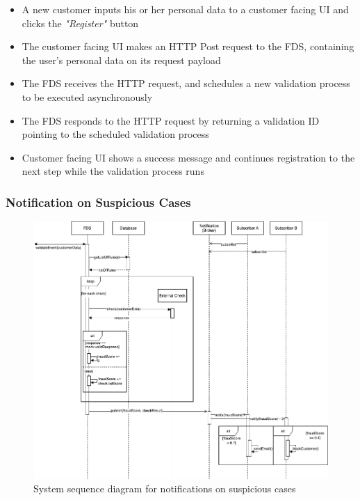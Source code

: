 \begin{itemize}
 \item A new customer inputs his or her personal data to a customer facing UI and clicks the \emph{"Register"} button
 \item The customer facing UI makes an HTTP Post request to the FDS, containing the user's personal data on its request payload
 \item The FDS receives the HTTP request, and schedules a new validation process to be executed asynchronously
 \item The FDS responds to the HTTP request by returning a validation ID pointing to the scheduled validation process
 \item Customer facing UI shows a success message and continues registration to the next step while the validation process runs 
\end{itemize}


\subsubsection{Notification on Suspicious Cases}
 \label{subsection:seq-notification}

\begin{figure}[!h]
 \includegraphics[width=\textwidth]{diagrams/sequence-notification.png}
 \caption{System sequence diagram for notifications on suspicious cases}
 \label{fig:notif-sequence}
\end{figure}

